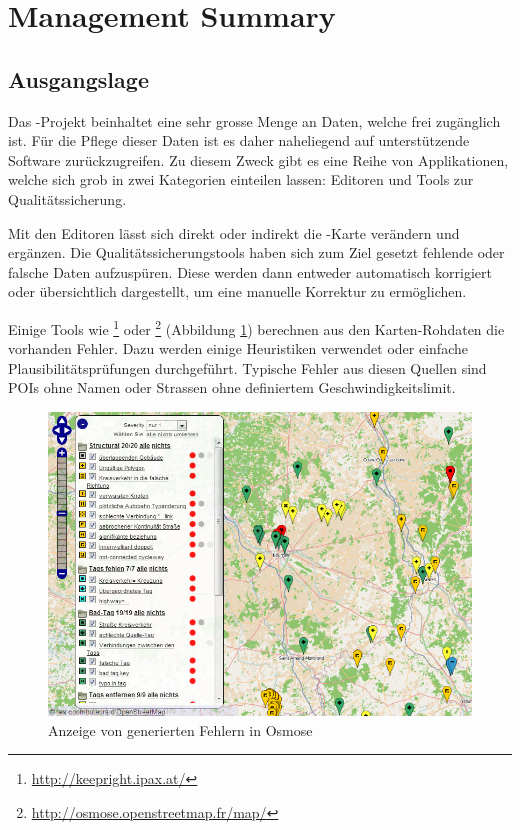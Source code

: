 \chapter*{Management Summary}
\thispagestyle{scrheadings}


\section*{Ausgangslage}
Das -Projekt beinhaltet eine sehr grosse Menge an Daten, welche frei zugänglich ist.
Für die Pflege dieser Daten ist es daher naheliegend auf unterstützende Software zurückzugreifen.
Zu diesem Zweck gibt es eine Reihe von Applikationen, welche sich grob in zwei Kategorien einteilen lassen:
Editoren und Tools zur Qualitätssicherung.

Mit den Editoren lässt sich direkt oder indirekt die -Karte verändern und ergänzen.
Die Qualitätssicherungstools haben sich zum Ziel gesetzt fehlende oder falsche Daten aufzuspüren.
Diese werden dann entweder automatisch korrigiert oder übersichtlich dargestellt, um eine manuelle Korrektur zu ermöglichen.

Einige Tools wie \footnote{\url{http://keepright.ipax.at/}} oder \footnote{\url{http://osmose.openstreetmap.fr/map/}} (Abbildung \ref{image-osmose-screenshot}) berechnen aus den Karten-Rohdaten die vorhanden Fehler.
Dazu werden einige Heuristiken verwendet oder einfache Plausibilitätsprüfungen durchgeführt.
Typische Fehler aus diesen Quellen sind \glspl{POI} ohne Namen oder Strassen ohne definiertem Geschwindigkeitslimit.

\begin{figure}[H]
	\centering
	\includegraphics[scale=0.4]{images/managementsummary/osmose-screenshot}
	\caption{Anzeige von generierten Fehlern in Osmose}
	\label{image-osmose-screenshot}
\end{figure}

